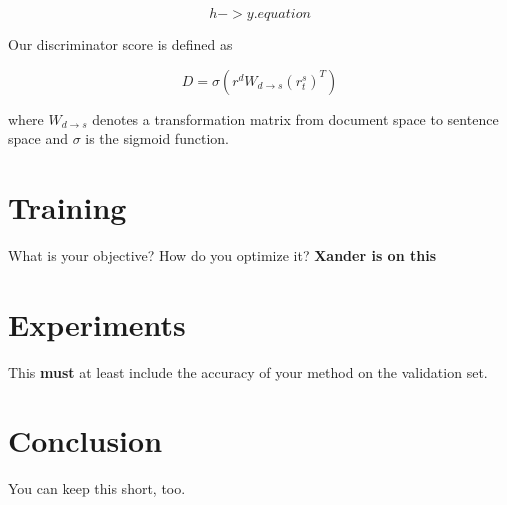 \documentclass{article}
\begin{document}
$$h->y.equation$$

Our discriminator score is defined as 

$$ D = \sigma(r^{d}W_{d \rightarrow s}(r^{s}_{t})^{T} )$$

where $W_{d \rightarrow s}$ denotes a transformation matrix from document space to sentence space and $\sigma$ is the sigmoid function.

\section{Training}
What is your objective? How do you optimize it?
\textbf{Xander is on this}
\section{Experiments}
This {\bf must} at least include the accuracy of your method on the validation set.
\section{Conclusion}
You can keep this short, too.
\end{document}
